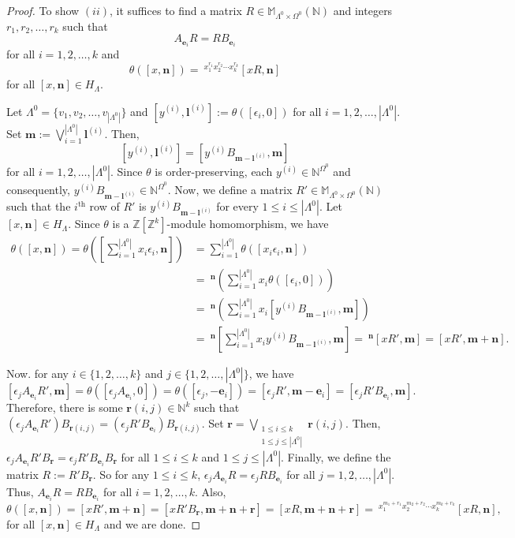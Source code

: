 \documentclass[12pt]{amsart}
\newcommand{\N}{\mathbf{n}}
\newcommand{\M}{\mathbf{m}}
\theoremstyle{definition}
\theoremstyle{remark}
\begin{document}
\begin{proof}
To show $(ii)$, it suffices to find a matrix $R\in \mathbb{M}_{\Lambda^0\times \Omega^0}(\mathbb{N})$ and integers $r_1,r_2,\ldots,r_k$ such that \[A_{\mathbf{e}_i}R=RB_{\mathbf{e}_i}\] for all $i=1,2,\ldots,k$ and \[\theta([x,\N])=~^{x_1^{r_1}x_2^{r_2}\cdots x_k^{r_k}}[xR,\N]\] for all $[x,\N]\in H_\Lambda$. 

Let $\Lambda^0=\{v_1,v_2,\ldots,v_{|\Lambda^0|}\}$ and $[y^{(i)},\mathbf{l}^{(i)}]:=\theta([\epsilon_i,0])$ for all $i=1,2,\ldots,|\Lambda^0|$. Set $\M:=\displaystyle{\bigvee_{i=1}^{|\Lambda^0|}} \mathbf{l}^{(i)}$. Then, \[[y^{(i)},\mathbf{l}^{(i)}]=[y^{(i)}B_{\M-\mathbf{l}^{(i)}},\M]\] for all $i=1,2,\ldots,|\Lambda^0|$. Since $\theta$ is order-preserving, each $y^{(i)}\in \mathbb{N}^{\Omega^0}$ and consequently, $y^{(i)}B_{\M-\mathbf{l}^{(i)}}\in \mathbb{N}^{\Omega^0}$. Now, we define a matrix $R'\in \mathbb{M}_{\Lambda^0\times \Omega^0}(\mathbb{N})$ such that the $i^{\text{th}}$ row of $R'$ is $y^{(i)}B_{\M-\mathbf{l}^{(i)}}$ for every $1\le i \le |\Lambda^0|$. Let $[x,\N]\in H_\Lambda$. Since $\theta$ is a $\mathbb{Z}[\mathbb{Z}^k]$-module homomorphism, we have
\begin{align*}
\theta([x,\N])=\theta([\displaystyle{\sum_{i=1}^{|\Lambda^0|}} x_i\epsilon_i,\N]) &=\displaystyle{\sum_{i=1}^{|\Lambda^0|}} \theta([x_i\epsilon_i,\N])\\
&=~^\N\left(\displaystyle{\sum_{i=1}^{|\Lambda^0|}} x_i\theta([\epsilon_i,0])\right)\\
&=~^\N(\displaystyle{\sum_{i=1}^{|\Lambda^0|}} x_i[y^{(i)}B_{\M-\mathbf{l}^{(i)}},\M])\\
&=~^\N[\displaystyle{\sum_{i=1}^{|\Lambda^0|}} x_iy^{(i)}B_{\M-\mathbf{l}^{(i)}},\M]=~^\N[xR',\M]=[xR',\M+\N].
\end{align*}

Now. for any $i\in \{1,2,\ldots,k\}$ and $j\in \{1,2,\ldots,|\Lambda^0|\}$, we have 
\[[\epsilon_jA_{\mathbf{e}_i}R',\M]=\theta([\epsilon_jA_{\mathbf{e}_i},0])=\theta([\epsilon_j,-\mathbf{e}_i])=[\epsilon_jR',\M-\mathbf{e}_i]=[\epsilon_jR' B_{\mathbf{e}_i},\M].\]
Therefore, there is some $\mathbf{r}(i,j)\in \mathbb{N}^k$ such that $(\epsilon_jA_{\mathbf{e}_i}R')B_{\mathbf{r}(i,j)}=(\epsilon_jR' B_{\mathbf{e}_i})B_{\mathbf{r}(i,j)}$. Set $\mathbf{r}=\displaystyle{\bigvee_{\substack{1\le i\le k\\1\le j \le |\Lambda^0|}}} \mathbf{r}(i,j)$. Then, $\epsilon_jA_{\mathbf{e}_i}R'B_\mathbf{r}=\epsilon_jR' B_{\mathbf{e}_i}B_\mathbf{r}$ for all $1\le i\le k$ and $1\le j\le |\Lambda^0|$. Finally, we define the matrix $R:=R'B_\mathbf{r}$. So for any $1\le i\le k$, $\epsilon_jA_{\mathbf{e}_i}R=\epsilon_jRB_{\mathbf{e}_i}$ for all $j=1,2,\ldots,|\Lambda^0|$. Thus, $A_{\mathbf{e}_i}R=RB_{\mathbf{e}_i}$ for all $i=1,2,\ldots,k$. Also, \[\theta([x,\N])=[xR',\M+\N]=[xR'B_\mathbf{r},\M+\N+\mathbf{r}]=[xR,\M+\N+\mathbf{r}]=~^{x_1^{m_1+r_1}x_2^{m_2+r_2}\cdots x_k^{m_k+r_k}}[xR,\N],\] for all $[x,\N]\in H_\Lambda$ and we are done.
\end{proof}
\end{document}
